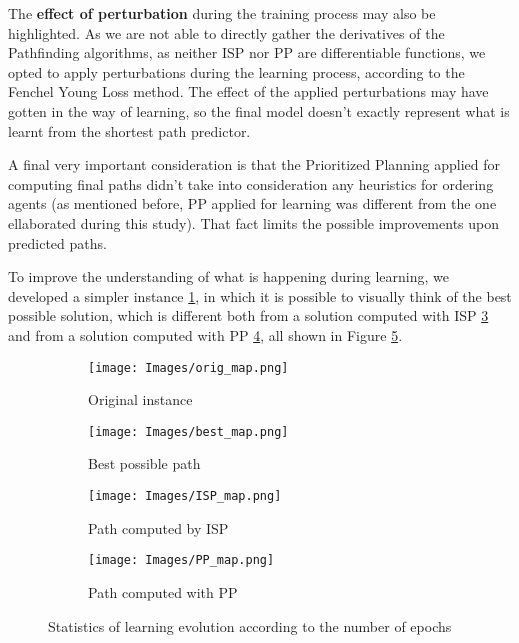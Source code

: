 The \textbf{effect of perturbation} during the training process may also be highlighted. As we are not able to directly gather the derivatives of the Pathfinding algorithms, as neither ISP nor PP are differentiable functions, we opted to apply perturbations during the learning process, according to the Fenchel Young Loss method. The effect of the applied perturbations may have gotten in the way of learning, so the final model doesn't exactly represent what is learnt from the shortest path predictor.

A final very important consideration is that the Prioritized Planning applied for computing final paths didn't take into consideration any heuristics for ordering agents (as mentioned before, PP applied for learning was different from the one ellaborated during this study). That fact limits the possible improvements upon predicted paths.

To improve the understanding of what is happening during learning, we developed a simpler instance \ref{fig:simple_instance}, in which it is possible to visually think of the best possible solution, which is different both from a solution computed with ISP \ref{fig:path_ISP} and from a solution computed with PP \ref{fig:path_PP}, all shown in Figure \ref{fig:simple_instance_fig}.

\begin{figure}[!ht]
    \centering
    \begin{subfigure}[b]{0.45\textwidth}
        \texttt{[image: Images/orig\_map.png]}
        \caption{Original instance}
        \label{fig:simple_instance}
    \end{subfigure}
    \hspace{0.01\textwidth}
    \begin{subfigure}[b]{0.45\textwidth}
        \texttt{[image: Images/best\_map.png]}
        \caption{Best possible path}
        \label{fig:best_path}
    \end{subfigure}

    \vspace{0.5cm}

    \begin{subfigure}[b]{0.45\textwidth}
        \texttt{[image: Images/ISP\_map.png]}
        \caption{Path computed by ISP}
        \label{fig:path_ISP}
    \end{subfigure}
    \hspace{0.01\textwidth}
    \begin{subfigure}[b]{0.45\textwidth}
        \texttt{[image: Images/PP\_map.png]}
        \caption{Path computed with PP}
        \label{fig:path_PP}
    \end{subfigure}
    
    \caption{Statistics of learning evolution according to the number of epochs}
    \label{fig:simple_instance_fig}
\end{figure}

